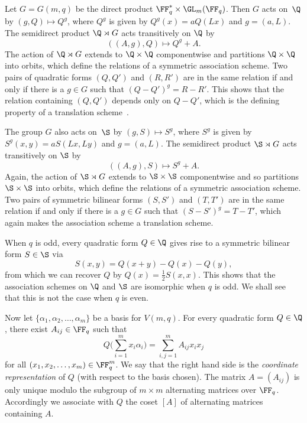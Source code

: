 Let $G=G(m,q)$ be the direct product $\FF_q^*\times\GL_m(\FF_q)$. Then $G$ acts on~$\Q$ by $(g,Q)\mapsto Q^g$, where $Q^g$ is given by $Q^g(x)=aQ(Lx)$ and $g=(a,L)$. The semidirect product $\Q\rtimes G$ acts transitively on $\Q$ by
\[
((A,g),Q)\mapsto Q^g+A.
\]
The action of $\Q\rtimes G$ extends to $\Q\times\Q$ componentwise and partitions $\Q\times \Q$ into orbits, which define the relations of a symmetric association scheme. Two pairs of quadratic forms $(Q,Q')$ and $(R,R')$ are in the same relation if and only if there is a $g\in G$ such that $(Q-Q')^g=R-R'$. This shows that the relation containing $(Q,Q')$ depends only on $Q-Q'$, which is the defining property of a translation scheme~\cite[Chapter V]{DelLev1998}.
\par
The group $G$ also acts on~$\S$ by $(g,S)\mapsto S^g$, where $S^g$ is given by $S^g(x,y)=aS(Lx,Ly)$ and $g=(a,L)$. The semidirect product $\S\rtimes G$ acts transitively on $\S$ by
\[
((A,g),S)\mapsto S^g+A.
\]
Again, the action of $\S\rtimes G$ extends to $\S\times\S$ componentwise and so partitions $\S\times \S$ into orbits, which define the relations of a symmetric association scheme. Two pairs of symmetric bilinear forms $(S,S')$ and $(T,T')$ are in the same relation if and only if there is a $g\in G$ such that $(S-S')^g=T-T'$, which again makes the association scheme a translation scheme.
\par
When $q$ is odd, every quadratic form $Q\in\Q$ gives rise to a symmetric bilinear form $S\in\S$ via
\begin{equation}
S(x,y)=Q(x+y)-Q(x)-Q(y),   \label{eqn:S_from_Q}
\end{equation}
from which we can recover $Q$ by $Q(x)=\tfrac{1}{2}S(x,x)$. This shows that the association schemes on $\Q$ and $\S$ are isomorphic when $q$ is odd. We shall see that this is not the case when $q$ is even.
\par
Now let $\{\alpha_1,\alpha_2,\dots,\alpha_m\}$ be a basis for $V(m,q)$. For every quadratic form $Q\in\Q$, there exist $A_{ij}\in\FF_q$ such that
\begin{equation}
Q\bigg(\sum_{i=1}^mx_i\alpha_i\bigg)=\sum_{i,j=1}^mA_{ij}x_ix_j   \label{eqn:coordinate_rep_Q}
\end{equation}
for all $(x_1,x_2,\dots,x_m)\in\FF_q^m$. We say that the right hand side is the \emph{coordinate representation} of $Q$ (with respect to the basis chosen). The matrix $A=(A_{ij})$ is only unique modulo the subgroup of $m\times m$ alternating matrices over $\FF_q$. Accordingly we associate with $Q$ the coset $[A]$ of alternating matrices containing $A$.
